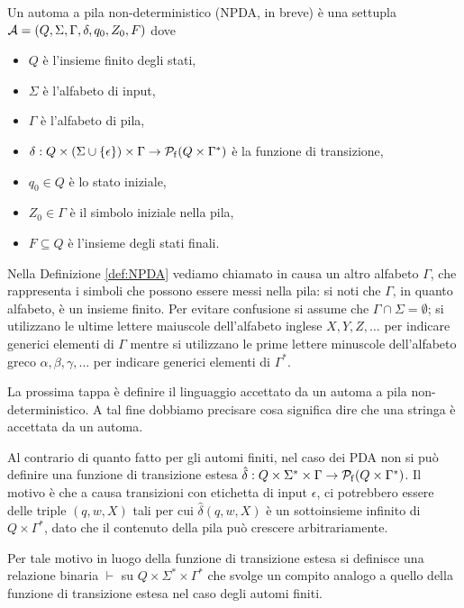 \documentclass[runningheads,a4paper]{llncs}
\begin{document}
\begin{definition}[NPDA]\label{def:NPDA}
Un automa a pila non-deterministico (NPDA, in breve) \`{e} una settupla $\mathcal{A} = (Q,\Sigma,\Gamma,\delta,q_0,Z_0,F)$ dove 
\begin{itemize}
\item $Q$ \`{e} l'insieme finito degli stati,
\item $\Sigma$ \`{e} l'alfabeto di input,
\item $\Gamma$ \`{e} l'alfabeto di pila,
\item $\delta: Q \times (\Sigma \cup \{\epsilon\}) \times \Gamma \to \mathcal{P}_\mathrm{f}(Q \times \Gamma^*)$ \`{e} la funzione di transizione,
\item $q_0 \in Q$ \`{e} lo stato iniziale,
\item $Z_0 \in \Gamma$ \`{e} il simbolo iniziale nella pila,
\item $F \subseteq Q$ \`{e} l'insieme degli stati finali.
\end{itemize}
\end{definition}

Nella Definizione \ref{def:NPDA} vediamo chiamato in causa un altro alfabeto $\Gamma$, che rappresenta i simboli che possono essere messi nella pila: si noti che $\Gamma$, in quanto alfabeto, \`{e} un insieme finito. Per evitare confusione si assume che $\Gamma \cap \Sigma = \emptyset$; si utilizzano le ultime lettere maiuscole dell'alfabeto inglese $X,Y,Z,\ldots$ per indicare generici elementi di $\Gamma$ mentre si utilizzano le prime lettere minuscole dell'alfabeto greco $\alpha,\beta,\gamma,\ldots$ per indicare generici elementi di $\Gamma^*$.

La prossima tappa \`{e} definire il linguaggio accettato da un automa a pila non-deterministico. A tal fine dobbiamo precisare cosa significa dire che una stringa \`{e} accettata da un automa.

Al contrario di quanto fatto per gli automi finiti, nel caso dei PDA non si pu\`{o} definire una funzione di transizione estesa $\hat{\delta}: Q \times \Sigma^* \times \Gamma \to \mathcal{P}_\mathrm{f}(Q \times \Gamma^*)$. Il motivo \`{e} che a causa transizioni con etichetta di input $\epsilon$, ci potrebbero essere delle triple $(q,w,X)$ tali per cui $\hat{\delta}(q,w,X)$ \`{e} un sottoinsieme infinito di $Q \times \Gamma^*$, dato che il contenuto della pila pu\`{o} crescere arbitrariamente.

Per tale motivo in luogo della funzione di transizione estesa si definisce una relazione binaria $\vdash$ su $Q \times \Sigma^* \times \Gamma^*$ che svolge un compito analogo a quello della funzione di transizione estesa nel caso degli automi finiti.
\end{document}
